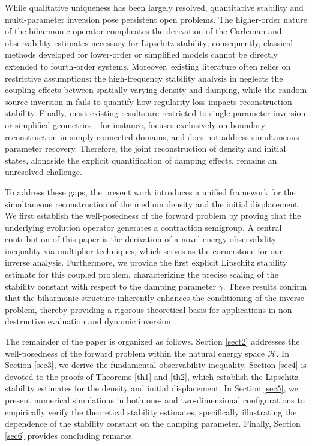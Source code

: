 \documentclass[12pt,reqno]{amsart}
\numberwithin{equation}{section}
\begin{document}
While qualitative uniqueness has been largely resolved, quantitative stability and 
multi-parameter inversion pose persistent open problems. The higher-order nature of the 
biharmonic operator complicates the derivation of the Carleman and observability 
estimates necessary for Lipschitz stability; consequently, classical methods developed 
for lower-order or simplified models \cite{Benrabah2019, Danh2019} cannot be directly 
extended to fourth-order systems. Moreover, existing literature often relies on 
restrictive assumptions: the high-frequency stability analysis in \cite{Zhao2025} 
neglects the coupling effects between spatially varying density and damping, while the 
random source inversion in \cite{Li2022a} fails to quantify how regularity loss impacts 
reconstruction stability. Finally, most existing results are restricted to single-parameter 
inversion or simplified geometries---for instance, \cite{Bouslah2024} focuses exclusively 
on boundary reconstruction in simply connected domains, and \cite{Bhattacharyya2025} does 
not address simultaneous parameter recovery. Therefore, the joint reconstruction of 
density and initial states, alongside the explicit quantification of damping effects, 
remains an unresolved challenge.

	
	
	To address these gaps, the present work introduces a unified framework for the simultaneous reconstruction of the medium density and the initial displacement. We first establish the well-posedness of the forward problem by proving that the underlying evolution operator generates a contraction semigroup. A central contribution of this paper is the derivation of a novel energy observability inequality via multiplier techniques, which serves as the cornerstone for our inverse analysis. Furthermore, we provide the first explicit Lipschitz stability estimate for this coupled problem, characterizing the precise scaling of the stability constant with respect to the damping parameter $\gamma$. These results confirm that the biharmonic structure inherently enhances the conditioning of the inverse problem, thereby providing a rigorous theoretical basis for applications in non-destructive evaluation and dynamic inversion.
	
	The remainder of the paper is organized as follows. Section \ref{sect2} addresses the well-posedness of the forward problem within the natural energy space $\mathcal{H}$. In Section \ref{sec3}, we derive the fundamental observability inequality. Section \ref{sec4} is devoted to the proofs of Theorems \ref{th1} and \ref{th2}, which establish the Lipschitz stability estimates for the density and initial displacement. In Section \ref{sec5}, we present numerical simulations in both one- and two-dimensional configurations to empirically verify the theoretical stability estimates, specifically illustrating the dependence of the stability constant on the damping parameter. Finally, Section \ref{sec6} provides concluding remarks.
	
\end{document}
